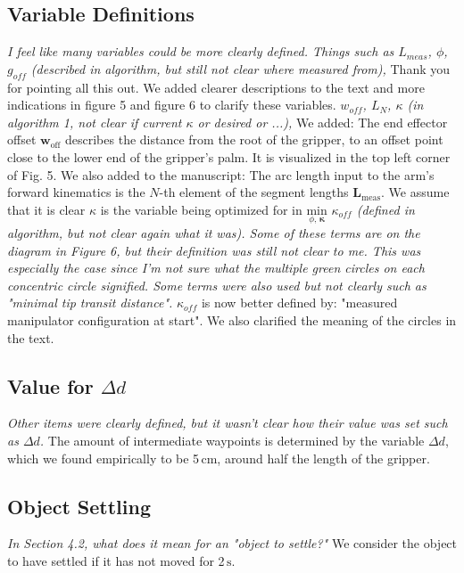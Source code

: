 \documentclass[letterpaper, 10 pt, twocolumn, conference]{article}
\newcommand{\unit}[1]{\ensuremath{\, \mathrm{#1}}} %
\begin{document}
\subsection{Variable Definitions}
\textit{I feel like many variables could be more clearly defined. Things such as $L_{meas}$, $\phi$, $g_{off}$ (described in algorithm, but still not clear where measured from),}
%
Thank you for pointing all this out. We added clearer descriptions to the text and more indications in figure 5 and figure 6 to clarify these variables.
%
\textit{$w_{off}$, $L_N$, $\kappa$ (in algorithm 1, not clear if current $\kappa$ or desired or ...),}
%
We added: The end effector offset $\mathbf{w}_{\textrm{off}}$ describes the distance from the root of the gripper, to an offset point close to the lower end of the gripper's palm. It is visualized in the top left corner of Fig. 5.
We also added to the manuscript: The arc length input to the arm's forward kinematics is the $N$-th element of the segment lengths $\mathbf{L}_{\textrm{meas}}$.
%
We assume that it is clear 
$\kappa$ is the variable being optimized for in $\underset{\phi, \, \boldsymbol{\kappa}}{\text{min}}$
%
\textit{$\kappa_{off}$ (defined in algorithm, but not clear again what it was). Some of these terms are on the diagram in Figure 6, but their definition was still not clear to me. This was especially the case since I'm not sure what the multiple green circles on each concentric circle signified. Some terms were also used but not clearly such as "minimal tip transit distance".}
%
$\kappa_{off}$  is now better defined by: "measured manipulator configuration at start". We also clarified the meaning of the circles in the text.
%
\subsection{Value for $\Delta d$}
\textit{Other items were clearly defined, but it wasn't clear how their value was set such as $\Delta d$.}
%
The amount of intermediate waypoints is determined by the variable $\Delta d$, which we found empirically to be 5\unit{cm}, around half the length of the gripper.
%
\subsection{Object Settling}
\textit{In Section 4.2, what does it mean for an "object to settle?"}
%
We consider the object to have settled if it has not moved for 2\unit{s}.
%
\end{document}
